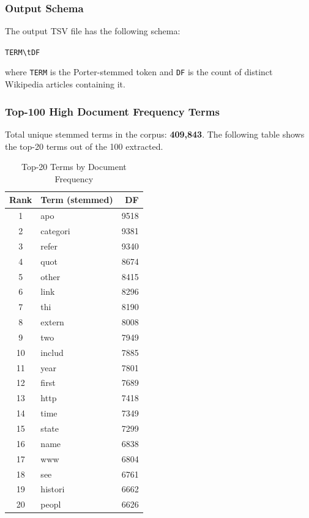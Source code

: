 \documentclass[12pt,a4paper]{article}
\begin{document}
\subsubsection{Output Schema}

The output TSV file has the following schema:

\begin{center}
\texttt{TERM\textbackslash tDF}
\end{center}

where \texttt{TERM} is the Porter-stemmed token and \texttt{DF} is the count of
distinct Wikipedia articles containing it.

\subsubsection{Top-100 High Document Frequency Terms}

Total unique stemmed terms in the corpus: \textbf{409,843}.
The following table shows the top-20 terms out of the 100 extracted.

\begin{table}[h]
\centering
\caption{Top-20 Terms by Document Frequency}
\begin{tabular}{@{}clr@{}}
\toprule
\textbf{Rank} & \textbf{Term (stemmed)} & \textbf{DF} \\
\midrule
1  & apo      & 9518 \\
2  & categori & 9381 \\
3  & refer    & 9340 \\
4  & quot     & 8674 \\
5  & other    & 8415 \\
6  & link     & 8296 \\
7  & thi      & 8190 \\
8  & extern   & 8008 \\
9  & two      & 7949 \\
10 & includ   & 7885 \\
11 & year     & 7801 \\
12 & first    & 7689 \\
13 & http     & 7418 \\
14 & time     & 7349 \\
15 & state    & 7299 \\
16 & name     & 6838 \\
17 & www      & 6804 \\
18 & see      & 6761 \\
19 & histori  & 6662 \\
20 & peopl    & 6626 \\
\bottomrule
\end{tabular}
\end{table}
\end{document}

